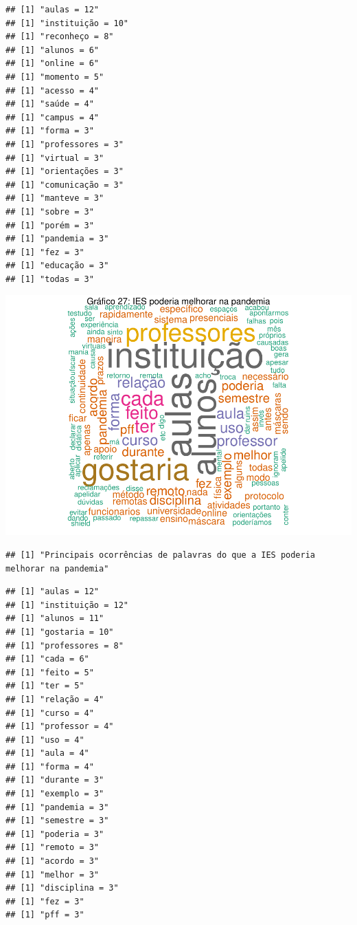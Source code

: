 \documentclass[
]{article}
\begin{document}
\begin{verbatim}
## [1] "aulas = 12"
## [1] "instituição = 10"
## [1] "reconheço = 8"
## [1] "alunos = 6"
## [1] "online = 6"
## [1] "momento = 5"
## [1] "acesso = 4"
## [1] "saúde = 4"
## [1] "campus = 4"
## [1] "forma = 3"
## [1] "professores = 3"
## [1] "virtual = 3"
## [1] "orientações = 3"
## [1] "comunicação = 3"
## [1] "manteve = 3"
## [1] "sobre = 3"
## [1] "porém = 3"
## [1] "pandemia = 3"
## [1] "fez = 3"
## [1] "educação = 3"
## [1] "todas = 3"
\end{verbatim}

\includegraphics{consequencias-oriundas-da-pandemia-v1.0_files/figure-latex/grafico-27-1.pdf}

\begin{verbatim}
## [1] "Principais ocorrências de palavras do que a IES poderia melhorar na pandemia"
\end{verbatim}

\begin{verbatim}
## [1] "aulas = 12"
## [1] "instituição = 12"
## [1] "alunos = 11"
## [1] "gostaria = 10"
## [1] "professores = 8"
## [1] "cada = 6"
## [1] "feito = 5"
## [1] "ter = 5"
## [1] "relação = 4"
## [1] "curso = 4"
## [1] "professor = 4"
## [1] "uso = 4"
## [1] "aula = 4"
## [1] "forma = 4"
## [1] "durante = 3"
## [1] "exemplo = 3"
## [1] "pandemia = 3"
## [1] "semestre = 3"
## [1] "poderia = 3"
## [1] "remoto = 3"
## [1] "acordo = 3"
## [1] "melhor = 3"
## [1] "disciplina = 3"
## [1] "fez = 3"
## [1] "pff = 3"
\end{verbatim}
\end{document}
